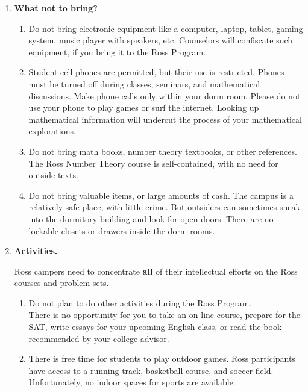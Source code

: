 \documentclass[11pt]{rossasia}
\begin{document}
\begin{enumerate}[label=(\arabic*),itemsep=2em,topsep=-1em]
\item \textbf{What not to bring?}
  \begin{enumerate}[label=(\alph*),itemsep=0.5em,topsep=0em]
  \item Do not bring electronic equipment like a computer, laptop,
    tablet, gaming system, music player with speakers, etc.  
    Counselors will confiscate such equipment, if you bring it to the
    Ross Program.
  \item Student cell phones are permitted, but their use is
    restricted. Phones must be turned off during classes, seminars,
    and mathematical discussions.  Make phone calls only within your dorm room.
    Please do not use your phone to play games or surf the internet.
    Looking up mathematical information will undercut the process of your
    mathematical explorations.
  \item Do not bring math books, number theory textbooks, or other references.  
    The Ross Number Theory course is self-contained, with no need for 
    outside texts.
  \item Do not bring valuable items, or large amounts of cash.  The
    campus is a relatively safe place, with little crime.  But
    outsiders can sometimes sneak into the dormitory building and look
    for open doors. There are no lockable closets or drawers inside the dorm rooms.

\end{enumerate}

\pagebreak
  \item {\bf Activities.} 
  
  Ross campers need to concentrate {\bf all} of their 
    intellectual efforts on the Ross courses and problem sets. 
    \begin{enumerate}[label=(\alph*),itemsep=0.5em,topsep=0em]
 \item   Do not plan to do other activities during the Ross Program. \\
    There is no opportunity for you to take an on-line course, 
    prepare  for the SAT, write essays for your upcoming English 
    class, or read the book recommended by your college advisor.
\item There is free time for students to play outdoor games. Ross participants
    have access to a running track, basketball course, and soccer field. \\
    Unfortunately, 
    no indoor spaces for sports are available.


\end{enumerate}
\end{enumerate}
\end{document}
